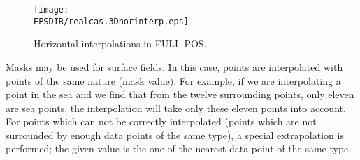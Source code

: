 \begin{figure}[!ht]
\centerline{\texttt{[image: \\EPSDIR/realcas.3Dhorinterp.eps]}}
\caption{Horizontal interpolations in FULL-POS.
\label{3Dhorinterp}}
\end{figure}

Masks may be used for surface fields. In this case, points are interpolated with
points of the same nature (mask value). For example, if we are interpolating a
point in the sea and we find that from the twelve surrounding points, only eleven
are sea points, the interpolation will take only these eleven points into account.
\\
For points which can not be correctly interpolated (points which are not surrounded
by enough data points of the same type), a special extrapolation is performed; the
given value is the one of the nearest data point of the same type.

